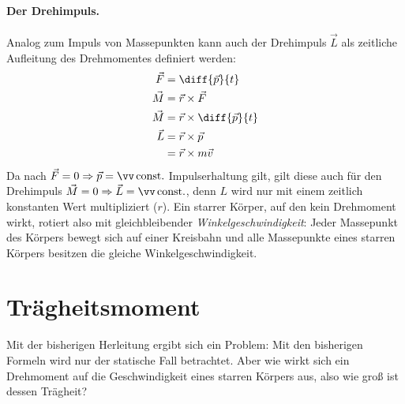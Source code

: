 \paragraph{Der Drehimpuls.}
Analog zum Impuls von Massepunkten kann auch der Drehimpuls $\vec L$ als zeitliche Aufleitung des Drehmomentes definiert werden:
\begin{align}
\nonumber \vec F &= \diff{\vec p}{t}\\
		  \vec M &= \vec r \times \vec F\\
		  \vec M &= \vec r \times \diff{\vec p}{t}\\
		  \vec L &= \vec r \times \vec p\\
		  \label{umfangsgeschwinigkeit}
		  		 &= \vec r \times m \vec v
\end{align}
Da nach $\vec F=0 \Rightarrow \vec p=\vv\const$ Impulserhaltung gilt, gilt diese auch für den Drehimpuls $\vec M=0 \Rightarrow \vec L=\vv\const$, denn $L$ wird nur mit einem zeitlich konstanten Wert multipliziert ($r$). Ein starrer Körper, auf den kein Drehmoment wirkt, rotiert also mit gleichbleibender \emph{Winkelgeschwindigkeit}: Jeder Massepunkt des Körpers bewegt sich auf einer Kreisbahn und alle Massepunkte eines starren Körpers besitzen die gleiche Winkelgeschwindigkeit.


\section{Trägheitsmoment}
Mit der bisherigen Herleitung ergibt sich ein Problem: Mit den bisherigen Formeln wird nur der statische Fall betrachtet. Aber wie wirkt sich ein Drehmoment auf die Geschwindigkeit eines starren Körpers aus, also wie groß ist dessen Trägheit?

